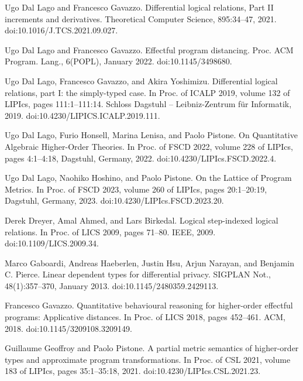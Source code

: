\par\noindent  [9]  Ugo Dal Lago and Francesco Gavazzo.  Differential logical relations, Part II increments and derivatives.  Theoretical Computer Science, 895:34–47, 2021.  doi:10.1016/J.TCS.2021.09.027.  
 
\par\noindent  [10]  Ugo Dal Lago and Francesco Gavazzo.  Effectful program distancing.  Proc. ACM Program. Lang., 6(POPL), January 2022.  doi:10.1145/3498680.  
 
\par\noindent  [11]  Ugo Dal Lago, Francesco Gavazzo, and Akira Yoshimizu.  Differential logical relations, part I: the simply-typed case.  In Proc. of ICALP 2019, volume 132 of LIPIcs, pages 111:1–111:14. Schloss Dagstuhl – Leibniz-Zentrum für Informatik, 2019.  doi:10.4230/LIPICS.ICALP.2019.111.  
 
\par\noindent  [12]  Ugo Dal Lago, Furio Honsell, Marina Lenisa, and Paolo Pistone.  On Quantitative Algebraic Higher-Order Theories.  In Proc. of FSCD 2022, volume 228 of LIPIcs, pages 4:1–4:18, Dagstuhl, Germany, 2022.  doi:10.4230/LIPIcs.FSCD.2022.4.  
 
\par\noindent  [13]  Ugo Dal Lago, Naohiko Hoshino, and Paolo Pistone.  On the Lattice of Program Metrics.  In Proc. of FSCD 2023, volume 260 of LIPIcs, pages 20:1–20:19, Dagstuhl, Germany, 2023.  doi:10.4230/LIPIcs.FSCD.2023.20.  
 
\par\noindent  [14]  Derek Dreyer, Amal Ahmed, and Lars Birkedal.  Logical step-indexed logical relations.  In Proc. of LICS 2009, pages 71–80. IEEE, 2009.  doi:10.1109/LICS.2009.34.  
 
\par\noindent  [15]  Marco Gaboardi, Andreas Haeberlen, Justin Hsu, Arjun Narayan, and Benjamin C. Pierce.  Linear dependent types for differential privacy.  SIGPLAN Not., 48(1):357–370, January 2013.  doi:10.1145/2480359.2429113.  
 
\par\noindent  [16]  Francesco Gavazzo.  Quantitative behavioural reasoning for higher-order effectful programs: Applicative distances.  In Proc. of LICS 2018, pages 452–461. ACM, 2018.  doi:10.1145/3209108.3209149.  
 
\par\noindent  [17]  Guillaume Geoffroy and Paolo Pistone.  A partial metric semantics of higher-order types and approximate program transformations.  In Proc. of CSL 2021, volume 183 of LIPIcs, pages 35:1–35:18, 2021.  doi:10.4230/LIPIcs.CSL.2021.23.  
 
